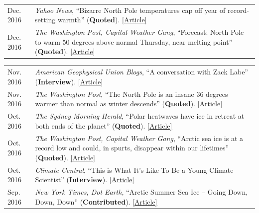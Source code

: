 \documentclass[margin,line,palatino,courier,10pt]{res}
\begin{document}
\begin{resume}
\begin{tabular}{@{}p{0.9in}p{4in}}
Dec. 2016 & \textit{Yahoo News}, ``Bizarre North Pole temperatures cap off year of record-setting warmth'' (\textbf{Quoted}). \href{https://www.yahoo.com/news/bizarre-north-pole-temperatures-cap-off-year-of-record-setting-warmth-181727978.html?soc_src=social-sh&soc_trk=tw}{[Article]}\\
Dec. 2016 & \textit{The Washington Post, Capital Weather Gang}, ``Forecast: North Pole to warm 50 degrees above normal Thursday, near melting point'' (\textbf{Quoted}). \href{https://www.washingtonpost.com/news/capital-weather-gang/wp/2016/12/20/forecast-north-pole-to-warm-50-degrees-above-normal-thursday-near-melting-point/?dfgdfgdfgdfg&utm_term=.e648369ada7e}{[Article]}\\
\end{tabular}
\begin{tabular}{@{}p{0.9in}p{4in}}
Nov. 2016 & \textit{American Geophysical Union Blogs}, ``A conversation with Zack Labe'' (\textbf{Interview}). \href{http://blogs.agu.org/mountainbeltway/2016/11/23/conversation-zack-labe/}{[Article]}\\
Nov. 2016 & \textit{The Washington Post}, ``The North Pole is an insane 36 degrees warmer than normal as winter descends'' (\textbf{Quoted}). \href{https://www.washingtonpost.com/news/energy-environment/wp/2016/11/17/the-north-pole-is-an-insane-36-degrees-warmer-than-normal-as-winter-descends/?utm_term=.f2cb9596b3d8}{[Article]}\\
Oct. 2016 & \textit{The Sydney Morning Herald}, ``Polar heatwaves have ice in retreat at both ends of the planet'' (\textbf{Quoted}). \href{http://www.smh.com.au/environment/climate-change/polar-heatwaves-have-ice-in-retreat-at-both-ends-of-the-planet-20161030-gse9q6.html}{[Article]}\\
Oct. 2016 & \textit{The Washington Post, Capital Weather Gang}, ``Arctic sea ice is at a record low and could, in spurts, disappear within our lifetimes'' (\textbf{Quoted}). \href{https://www.washingtonpost.com/news/capital-weather-gang/wp/2016/10/27/arctic-sea-ice-is-at-a-record-low-and-could-in-spurts-disappear-within-our-lifetimes/}{[Article]}\\
Oct. 2016 & \textit{Climate Central}, ``This is What It's Like To Be a Young Climate Scientist'' (\textbf{Interview}). \href{http://www.climatecentral.org/news/young-climate-scientists-interviews-20799}{[Article]}\\
Sep. 2016 & \textit{New York Times, Dot Earth}, ``Arctic Summer Sea Ice -- Going Down, Down, Down'' (\textbf{Contributed}). \href{http://dotearth.blogs.nytimes.com/2016/09/16/arctic-summer-sea-ice-going-down-down-down/?module=BlogPost-ReadMore&version=Blog\%20Main&action=Click&contentCollection=arctic&pgtype=Blogs&region=Body&_r=1#more-58318}{[Article]}\\

\end{tabular}
\end{resume}
\end{document}
